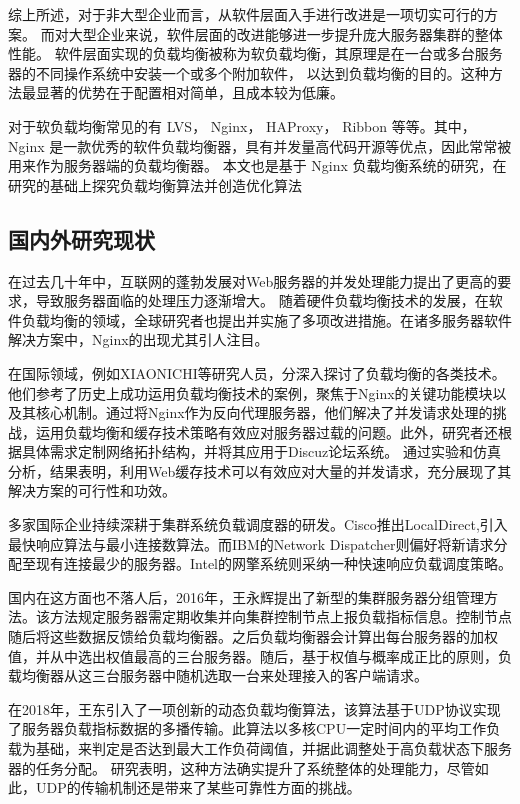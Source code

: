 综上所述，对于非大型企业而言，从软件层面入手进行改进是一项切实可行的方案。
而对大型企业来说，软件层面的改进能够进一步提升庞大服务器集群的整体性能。
软件层面实现的负载均衡被称为软负载均衡，其原理是在一台或多台服务器的不同操作系统中安装一个或多个附加软件，
以达到负载均衡的目的。这种方法最显著的优势在于配置相对简单，且成本较为低廉。

对于软负载均衡常见的有 LVS\cite{lijp}， Nginx\cite{Zepeng}， HAProxy\cite{li2019dynamic}， Ribbon 等等。其中，Nginx 是一款优秀的软件负载均衡器，具有并发量高代码开源等优点，因此常常被用来作为服务器端的负载均衡器。
本文也是基于 Nginx 负载均衡系统的研究，在研究的基础上探究负载均衡算法并创造优化算法

\subsection{国内外研究现状}

在过去几十年中，互联网的蓬勃发展对Web服务器的并发处理能力提出了更高的要求，导致服务器面临的处理压力逐渐增大。
随着硬件负载均衡技术的发展，在软件负载均衡的领域，全球研究者也提出并实施了多项改进措施。在诸多服务器软件解决方案中，Nginx的出现尤其引人注目。

在国际领域，例如XIAONICHI等研究人员\cite{chi2012web}，分深入探讨了负载均衡的各类技术。他们参考了历史上成功运用负载均衡技术的案例，聚焦于Nginx的关键功能模块以及其核心机制。通过将Nginx作为反向代理服务器，他们解决了并发请求处理的挑战，运用负载均衡和缓存技术策略有效应对服务器过载的问题。此外，研究者还根据具体需求定制网络拓扑结构，并将其应用于Discuz论坛系统。
通过实验和仿真分析，结果表明，利用Web缓存技术可以有效应对大量的并发请求，充分展现了其解决方案的可行性和功效。

多家国际企业持续深耕于集群系统负载调度器的研发。Cisco推出LocalDirect,引入最快响应算法与最小连接数算法。而IBM的Network Dispatcher则偏好将新请求分配至现有连接最少的服务器。Intel的网擎系统则采纳一种快速响应负载调度策略\cite{张淇2020服务器集群负载均衡算法在商务系统中的研究与应用}。

国内在这方面也不落人后，2016年，王永辉提出了新型的集群服务器分组管理方法。该方法规定服务器需定期收集并向集群控制节点上报负载指标信息。控制节点随后将这些数据反馈给负载均衡器。之后负载均衡器会计算出每台服务器的加权值，并从中选出权值最高的三台服务器。随后，基于权值与概率成正比的原则，负载均衡器从这三台服务器中随机选取一台来处理接入的客户端请求\cite{王永辉2015基于}。

在2018年，王东引入了一项创新的动态负载均衡算法，该算法基于UDP协议实现了服务器负载指标数据的多播传输。此算法以多核CPU一定时间内的平均工作负载为基础，来判定是否达到最大工作负荷阈值，并据此调整处于高负载状态下服务器的任务分配。
研究表明，这种方法确实提升了系统整体的处理能力，尽管如此，UDP的传输机制还是带来了某些可靠性方面的挑战\cite{王东2018动态反馈负载均衡策略的研究}。

